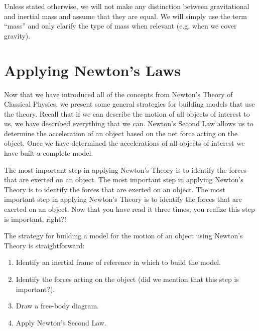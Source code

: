 Unless stated otherwise, we will not make any distinction between gravitational and inertial mass and assume that they are equal. We will simply use the term ``mass'' and only clarify the type of mass when relevant (e.g. when we cover gravity).

\section{Applying Newton's Laws}
Now that we have introduced all of the concepts from Newton's Theory of Classical Physics, we present some general strategies for building models that use the theory. Recall that if we can describe the motion of all objects of interest to us, we have described everything that we can. Newton's Second Law allows us to determine the acceleration of an object based on the net force acting on the object. Once we have determined the accelerations of all objects of interest we have built a complete model. 

The most important step in applying Newton's Theory is to identify the forces that are exerted on an object. The most important step in applying Newton's Theory is to identify the forces that are exerted on an object. The most important step in applying Newton's Theory is to identify the forces that are exerted on an object. Now that you have read it three times, you realize this step is important, right?!

The strategy for building a model for the motion of an object using Newton's Theory is straightforward:
\begin{enumerate}
\item Identify an inertial frame of reference in which to build the model.
\item Identify the forces acting on the object (did we mention that this step is important?).
\item Draw a free-body diagram.
\item Apply Newton's Second Law.
\end{enumerate}

